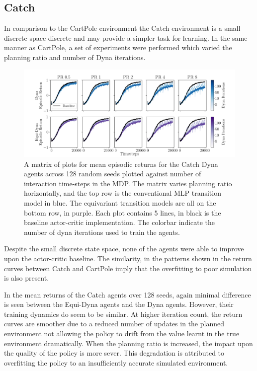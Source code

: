 \subsection{Catch}
In comparison to the CartPole environment the Catch environment is a small discrete space discrete and may provide a simpler task for learning.
In the same manner as CartPole, a set of experiments were performed which varied the planning ratio and number of Dyna iterations.
\begin{figure}[h!]
	\centering
	\includegraphics[width=\textwidth]{Figures/dyna_sweep_catch.png}
	\caption{A matrix of plots for mean episodic returns for the Catch Dyna agents across 128 random seeds
		plotted against number of interaction time-steps in the MDP. The matrix varies planning ratio horizontally, and the top row is the conventional MLP transition model in blue. The equivariant transition models are all on the bottom row, in purple. Each plot contains 5 lines, in black is the baseline actor-critic implementation. The colorbar indicate the number of dyna iterations used to train the agents.}
	\label{fig:catch_dyna}
\end{figure}
Despite the small discrete state space, none of the agents were able to improve upon the actor-critic baseline. The similarity, in the patterns shown in the return curves between Catch and CartPole imply that the overfitting to poor simulation is also present.

In the mean returns of the Catch agents over 128 seeds, again minimal difference is seen between the Equi-Dyna agents and the Dyna agents. However, their training dynamics do seem to be similar. At higher iteration count, the return curves are smoother due to a reduced number of updates in the planned environment not allowing the policy to drift from the value learnt in the true environment dramatically. When the planning ratio is increased, the impact upon the quality of the policy is more sever. This degradation is attributed to overfitting the policy to an insufficiently accurate simulated environment.

